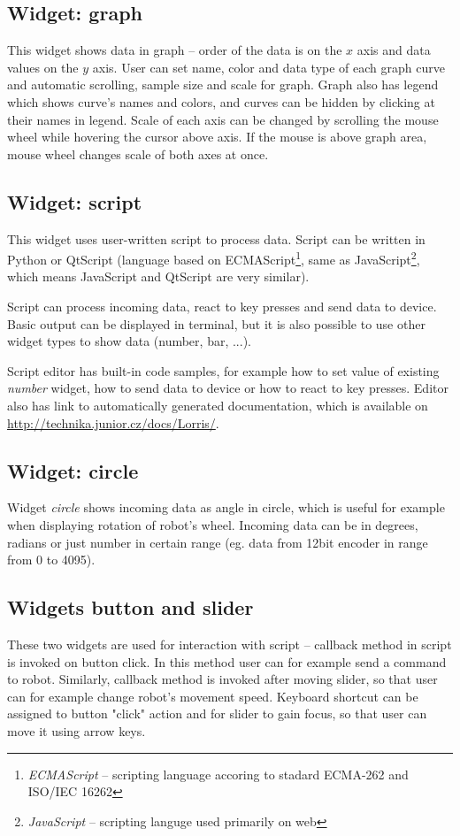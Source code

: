 \documentclass[12pt, a4paper, oneside]{article}
\newcommand{\It}{\textit}  %
\begin{document}
\subsection{Widget: graph}
This widget shows data in graph -- order of the data is on the $x$ axis and data values on the $y$ axis. User can set name, color and data type of each graph curve and automatic scrolling, sample size and scale for graph. Graph also has legend which shows curve's names and colors, and curves can be hidden by clicking at their names in legend. Scale of each axis can be changed by scrolling the mouse wheel while hovering the cursor above axis. If the mouse is above graph area, mouse wheel changes scale of both axes at once.

\subsection{Widget: script}
This widget uses user-written script to process data. Script can be written in Python or QtScript (language based on ECMAScript\footnote{\It{ECMAScript} -- scripting language accoring to stadard ECMA-262 and ISO/IEC 16262}, same as JavaScript\footnote{\It{JavaScript} -- scripting languge used primarily on web}, which means JavaScript and QtScript are very similar).

Script can process incoming data, react to key presses and send data to device. Basic output can be displayed in terminal, but it is also possible to use other widget types to show data (number, bar, ...).

Script editor has built-in code samples, for example how to set value of existing \It{number} widget, how to send data to device or how to react to key presses. Editor also has link to automatically generated documentation, which is available on \url{http://technika.junior.cz/docs/Lorris/}.

\subsection{Widget: circle}
Widget \It{circle} shows incoming data as angle in circle, which is useful for example when displaying rotation of robot's wheel. Incoming data can be in degrees, radians or just number in certain range (eg. data from 12bit encoder in range from 0 to 4095).

\subsection{Widgets button and slider}
These two widgets are used for interaction with script -- callback method in script is invoked on button click. In this method user can for example send a command to robot. Similarly, callback method is invoked after moving slider, so that user can for example change robot's movement speed. Keyboard shortcut can be assigned to button "click" action and for slider to gain focus, so that user can move it using arrow keys.
\end{document}
